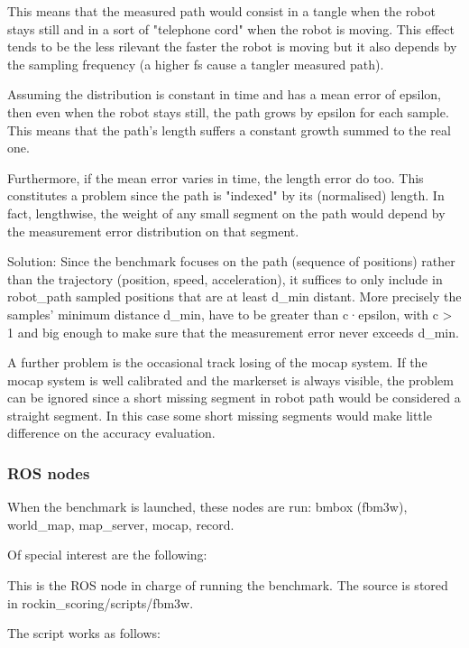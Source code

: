 \documentclass[a4paper]{article}
\begin{document}
This means that the measured path would consist in a tangle when the robot stays still and in a sort of "telephone cord" when the robot is moving.
This effect tends to be the less rilevant the faster the robot is moving but it also depends by the sampling frequency (a higher fs cause a tangler measured path).

Assuming the distribution is constant in time and has a mean error of epsilon,
then even when the robot stays still, the path grows by epsilon for each sample.
This means that the path's length suffers a constant growth summed to the real one.

Furthermore, if the mean error varies in time, the length error do too.
This constitutes a problem since the path is "indexed" by its (normalised) length.
In fact, lengthwise, the weight of any small segment on the path would depend by the measurement error distribution on that segment.
 
Solution:
Since the benchmark focuses on the path (sequence of positions) rather than the trajectory (position, speed, acceleration), it suffices to only include in robot\_path sampled positions that are at least d\_min distant.
More precisely the samples' minimum distance d\_min, have to be greater than c·epsilon, with c > 1 and big enough to make sure that the measurement error never exceeds d\_min.

A further problem is the occasional track losing of the mocap system. If the mocap system is well calibrated and the markerset is always visible, the problem can be ignored since a short missing segment in robot path would be considered a straight segment. In this case some short missing segments would make little difference on the accuracy evaluation.


\subsubsection{ROS nodes}

When the benchmark is launched, these nodes are run: bmbox (fbm3w), world\_map, map\_server, mocap, record.

Of special interest are the following:

\label{sec:fbm3w_benchmark_node}

This is the ROS node in charge of running the benchmark.
The source is stored in rockin\_scoring/scripts/fbm3w.

The script works as follows:
\end{document}
